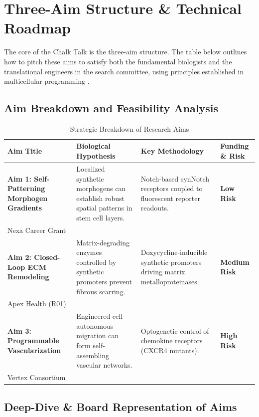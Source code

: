 \section{Three-Aim Structure \& Technical Roadmap}
The core of the Chalk Talk is the three-aim structure. The table below outlines how to pitch these aims to satisfy both the fundamental biologists and the translational engineers in the search committee, using principles established in multicellular programming \cite{daniels2024programming}.

\subsection{Aim Breakdown and Feasibility Analysis}

\begin{table}[h]
\centering
\caption{Strategic Breakdown of Research Aims}
\label{tab:aims}
\begin{tabular}{@{}p{3.5cm}p{4.8cm}p{4.8cm}p{3.5cm}@{}}
\toprule
\textbf{Aim Title} & \textbf{Biological Hypothesis} & \textbf{Key Methodology} & \textbf{Funding \& Risk} \\ \midrule
\textbf{Aim 1: Self-Patterning Morphogen Gradients} & Localized synthetic morphogens can establish robust spatial patterns in stem cell layers. & Notch-based synNotch receptors coupled to fluorescent reporter readouts. & \textbf{Low Risk} \\ Nexa Career Grant \\
\textbf{Aim 2: Closed-Loop ECM Remodeling} & Matrix-degrading enzymes controlled by synthetic promoters prevent fibrous scarring. & Doxycycline-inducible synthetic promoters driving matrix metalloproteinases. & \textbf{Medium Risk} \\ Apex Health (R01) \\
\textbf{Aim 3: Programmable Vascularization} & Engineered cell-autonomous migration can form self-assembling vascular networks. & Optogenetic control of chemokine receptors (CXCR4 mutants). & \textbf{High Risk} \\ Vertex Consortium \\ \bottomrule
\end{tabular}
\end{table}

\subsection{Deep-Dive \& Board Representation of Aims}

